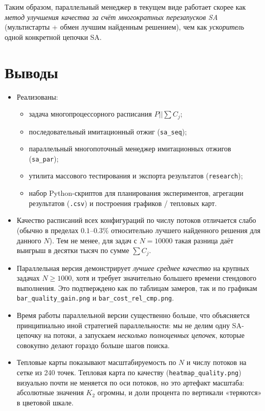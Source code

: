 \documentclass[a4paper,12pt]{article}
\begin{document}
Таким образом, параллельный менеджер в текущем виде работает скорее как \emph{метод улучшения качества за счёт многократных перезапусков SA} (мультистарты + обмен лучшим найденным решением), чем как \emph{ускоритель} одной конкретной цепочки SA.

\section{Выводы}

\begin{itemize}
    \item Реализованы:
    \begin{itemize}
        \item задача многопроцессорного расписания $P||\sum C_j$;
        \item последовательный имитационный отжиг (\texttt{sa\_seq});
        \item параллельный многопоточный менеджер имитационных отжигов (\texttt{sa\_par});
        \item утилита массового тестирования и экспорта результатов (\texttt{research});
        \item набор Python-скриптов для планирования экспериментов, агрегации результатов (\texttt{.csv}) и построения графиков / тепловых карт.
    \end{itemize}

    \item Качество расписаний всех конфигураций по числу потоков отличается слабо (обычно в пределах $0.1$--$0.3\%$ относительно лучшего найденного решения для данного $N$). Тем не менее, для задач с $N=10000$ такая разница даёт выигрыш в десятки тысяч по сумме $\sum C_j$.

    \item Параллельная версия демонстрирует \emph{лучшее среднее качество} на крупных задачах $N \ge 1000$, хотя и требует значительно большего времени стендового выполнения. Это подтверждено как по таблицам замеров, так и по графикам \texttt{bar\_quality\_gain.png} и \texttt{bar\_cost\_rel\_cmp.png}.

    \item Время работы параллельной версии существенно больше, что объясняется принципиально иной стратегией параллельности: мы не делим одну SA-цепочку на потоки, а запускаем \emph{несколько полноценных цепочек}, которые совокупно делают гораздо больше шагов поиска.

    \item Тепловые карты показывают масштабируемость по $N$ и числу потоков на сетке из 240 точек. Тепловая карта по качеству (\texttt{heatmap\_quality.png}) визуально почти не меняется по оси потоков, но это артефакт масштаба: абсолютные значения $K_2$ огромны, и доли процента по вертикали «теряются» в цветовой шкале.
\end{itemize}
\end{document}
